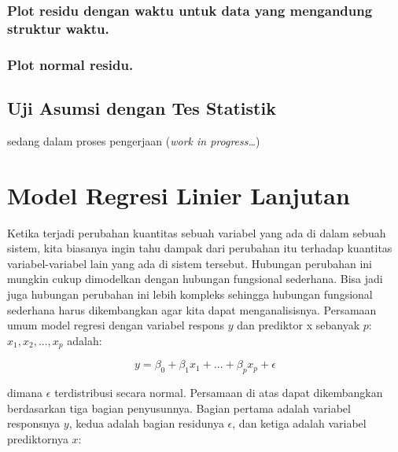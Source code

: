 \documentclass[
]{book}
\begin{document}
\hypertarget{plot-residu-dengan-waktu-untuk-data-yang-mengandung-struktur-waktu.}{%
\subsection{Plot residu dengan waktu untuk data yang mengandung struktur waktu.}\label{plot-residu-dengan-waktu-untuk-data-yang-mengandung-struktur-waktu.}}

\hypertarget{plot-normal-residu.}{%
\subsection{Plot normal residu.}\label{plot-normal-residu.}}

\hypertarget{uji-asumsi-dengan-tes-statistik}{%
\section{Uji Asumsi dengan Tes Statistik}\label{uji-asumsi-dengan-tes-statistik}}

sedang dalam proses pengerjaan (\emph{work in progress\ldots{}})

\hypertarget{model-regresi-linier-lanjutan}{%
\chapter{Model Regresi Linier Lanjutan}\label{model-regresi-linier-lanjutan}}

Ketika terjadi perubahan kuantitas sebuah variabel yang ada di dalam sebuah sistem, kita biasanya ingin tahu dampak dari perubahan itu terhadap kuantitas variabel-variabel lain yang ada di sistem tersebut. Hubungan perubahan ini mungkin cukup dimodelkan dengan hubungan fungsional sederhana. Bisa jadi juga hubungan perubahan ini lebih kompleks sehingga hubungan fungsional sederhana harus dikembangkan agar kita dapat menganalisisnya.
Persamaan umum model regresi dengan variabel respons \(y\) dan prediktor x sebanyak \(p\): \(x_1, x_2, ... , x_p\) adalah:

\begin{equation}
y = \beta_0 + \beta_1x_1 + ... + \beta_px_p + \epsilon
\label{eq:persamaan-lanjutan}
\end{equation}

dimana \(\epsilon\) terdistribusi secara normal. Persamaan di atas dapat dikembangkan berdasarkan tiga bagian penyusunnya. Bagian pertama adalah variabel responsnya \(y\), kedua adalah bagian residunya \(\epsilon\), dan ketiga adalah variabel prediktornya \(x\):
\end{document}
